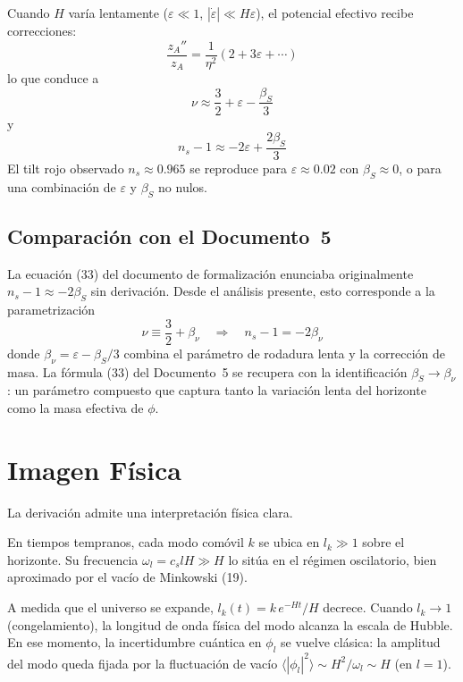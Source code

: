 \documentclass[12pt,a4paper]{article}
\begin{document}
Cuando $H$ varía lentamente ($\varepsilon \ll 1$, $|\dot{\varepsilon}| \ll H\varepsilon$), el potencial efectivo recibe correcciones:
\begin{equation}
\frac{z_A''}{z_A} = \frac{1}{\eta^2}\left(2 + 3\varepsilon + \cdots\right) \tag{31}
\end{equation}
lo que conduce a
\begin{equation}
\nu \approx \frac{3}{2} + \varepsilon - \frac{\beta_S}{3} \tag{32}
\end{equation}
y
\begin{equation}
n_s - 1 \approx -2\varepsilon + \frac{2\beta_S}{3} \tag{33}
\end{equation}
El tilt rojo observado $n_s \approx 0.965$ se reproduce para $\varepsilon \approx 0.02$ con $\beta_S \approx 0$, o para una combinación de $\varepsilon$ y $\beta_S$ no nulos.

\subsection{Comparación con el Documento~5}

La ecuación (33) del documento de formalización enunciaba originalmente $n_s - 1 \approx -2\beta_S$ sin derivación. Desde el análisis presente, esto corresponde a la parametrización
\begin{equation}
\nu \equiv \frac{3}{2} + \beta_\nu \quad \Longrightarrow \quad n_s - 1 = -2\beta_\nu \tag{34}
\end{equation}
donde $\beta_\nu = \varepsilon - \beta_S/3$ combina el parámetro de rodadura lenta y la corrección de masa. La fórmula (33) del Documento~5 se recupera con la identificación $\beta_S \to \beta_\nu$: un parámetro compuesto que captura tanto la variación lenta del horizonte como la masa efectiva de $\phi$.

\section{Imagen Física}

La derivación admite una interpretación física clara.

En tiempos tempranos, cada modo comóvil $k$ se ubica en $l_k \gg 1$ sobre el horizonte. Su frecuencia $\omega_l = c_s l H \gg H$ lo sitúa en el régimen oscilatorio, bien aproximado por el vacío de Minkowski (19).

A medida que el universo se expande, $l_k(t) = k\,e^{-Ht}/H$ decrece. Cuando $l_k \to 1$ (congelamiento), la longitud de onda física del modo alcanza la escala de Hubble. En ese momento, la incertidumbre cuántica en $\phi_l$ se vuelve clásica: la amplitud del modo queda fijada por la fluctuación de vacío $\langle|\phi_l|^2\rangle \sim H^2 / \omega_l \sim H$ (en $l = 1$).
\end{document}
